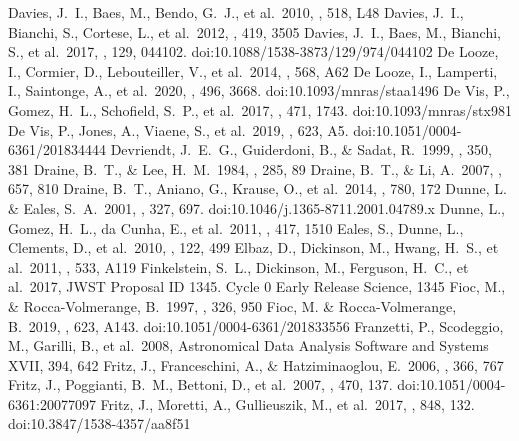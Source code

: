 \documentclass{aa}
\begin{document}
\begin{thebibliography}{}
  Davies, J.~I., Baes, M., Bendo, G.~J., et al.\ 2010, \aap, 518, L48
  Davies, J.~I., Bianchi, S., Cortese, L., et al.\ 2012, \mnras, 419, 3505
  Davies, J.~I., Baes, M., Bianchi, S., et al.\ 2017, \pasp, 129, 044102. doi:10.1088/1538-3873/129/974/044102
  De Looze, I., Cormier, D., Lebouteiller, V., et al.\ 2014, \aap, 568, A62
  De Looze, I., Lamperti, I., Saintonge, A., et al.\ 2020, \mnras, 496, 3668. doi:10.1093/mnras/staa1496
  De Vis, P., Gomez, H.~L., Schofield, S.~P., et al.\ 2017, \mnras, 471, 1743. doi:10.1093/mnras/stx981
 De Vis, P., Jones, A., Viaene, S., et al.\ 2019, \aap, 623, A5. doi:10.1051/0004-6361/201834444
  Devriendt, J.~E.~G., Guiderdoni, B., \& Sadat, R.\ 1999, \aap, 350, 381 
  Draine, B.~T., \& Lee, H.~M.\ 1984, \apj, 285, 89
  Draine, B.~T., \& Li, A.\ 2007, \apj, 657, 810 
  Draine, B.~T., Aniano, G., Krause, O., et al.\ 2014, \apj, 780, 172
  Dunne, L. \& Eales, S.~A.\ 2001, \mnras, 327, 697. doi:10.1046/j.1365-8711.2001.04789.x
  Dunne, L., Gomez, H.~L., da Cunha, E., et al.\ 2011, \mnras, 417, 1510
  Eales, S., Dunne, L., Clements, D., et al.\ 2010, \pasp, 122, 499
  Elbaz, D., Dickinson, M., Hwang, H.~S., et al.\ 2011, \aap, 533, A119
  Finkelstein, S.~L., Dickinson, M., Ferguson, H.~C., et al.\ 2017, JWST Proposal ID 1345. Cycle 0 Early Release Science, 1345
  Fioc, M., \& Rocca-Volmerange, B.\ 1997, \aap, 326, 950
  Fioc, M. \& Rocca-Volmerange, B.\ 2019, \aap, 623, A143. doi:10.1051/0004-6361/201833556
  Franzetti, P., Scodeggio, M., Garilli, B., et al.\ 2008, Astronomical Data Analysis Software and Systems XVII, 394, 642
  Fritz, J., Franceschini, A., \& Hatziminaoglou, E.\ 2006, \mnras, 366, 767
  Fritz, J., Poggianti, B.~M., Bettoni, D., et al.\ 2007, \aap, 470, 137. doi:10.1051/0004-6361:20077097
 Fritz, J., Moretti, A., Gullieuszik, M., et al.\ 2017, \apj, 848, 132. doi:10.3847/1538-4357/aa8f51

\end{thebibliography}
\end{document}
